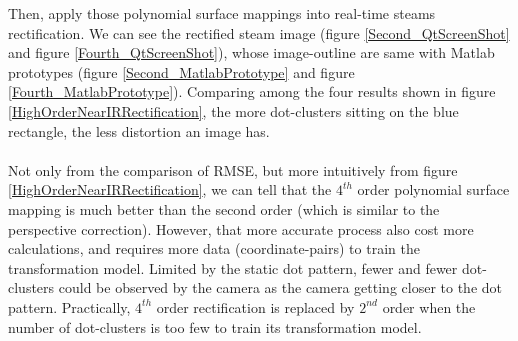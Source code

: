 %
Then, apply those polynomial surface mappings into real-time steams rectification. We can see the rectified steam image (figure \ref{Second_QtScreenShot} and figure \ref{Fourth_QtScreenShot}), whose image-outline are same with Matlab prototypes (figure \ref{Second_MatlabPrototype} and figure \ref{Fourth_MatlabPrototype}). Comparing among the four results shown in figure \ref{HighOrderNearIRRectification}, the more dot-clusters sitting on the blue rectangle, the less distortion an image has.%
\\\\%
Not only from the comparison of RMSE, but more intuitively from figure \ref{HighOrderNearIRRectification}, we can tell that the \(4^{th}\) order polynomial surface mapping is much better than the second order (which is similar to the perspective correction). However, that more accurate process also cost more calculations, and requires more data (coordinate-pairs) to train the transformation model. Limited by the static dot pattern, fewer and fewer dot-clusters could be observed by the camera as the camera getting closer to the dot pattern. Practically, \(4^{th}\) order rectification is replaced by \(2^{nd}\) order when the number of dot-clusters is too few to train its transformation model.
%
%
%
